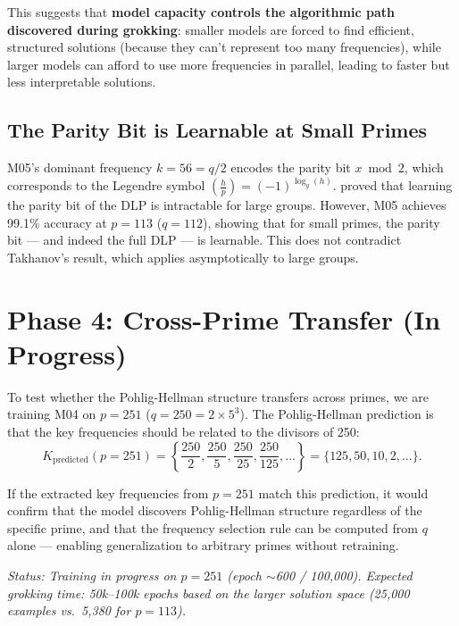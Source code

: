 \documentclass[11pt]{article}
\newcommand{\logg}{\log_g}
\begin{document}
This suggests that \textbf{model capacity controls the algorithmic path discovered during grokking}: smaller models are forced to find efficient, structured solutions (because they can't represent too many frequencies), while larger models can afford to use more frequencies in parallel, leading to faster but less interpretable solutions.

\subsection{The Parity Bit is Learnable at Small Primes}

M05's dominant frequency $k = 56 = q/2$ encodes the parity bit $x \bmod 2$, which corresponds to the Legendre symbol $\left(\frac{h}{p}\right) = (-1)^{\logg(h)}$. \citet{takhanov2024intractability} proved that learning the parity bit of the DLP is intractable for large groups. However, M05 achieves 99.1\% accuracy at $p = 113$ ($q = 112$), showing that for small primes, the parity bit --- and indeed the full DLP --- is learnable. This does not contradict Takhanov's result, which applies asymptotically to large groups.


\section{Phase 4: Cross-Prime Transfer (In Progress)}

To test whether the Pohlig-Hellman structure transfers across primes, we are training M04 on $p = 251$ ($q = 250 = 2 \times 5^3$). The Pohlig-Hellman prediction is that the key frequencies should be related to the divisors of 250:
\begin{equation}
    K_{\text{predicted}}(p = 251) = \left\{ \frac{250}{2}, \frac{250}{5}, \frac{250}{25}, \frac{250}{125}, \ldots \right\} = \{125, 50, 10, 2, \ldots\}.
\end{equation}

If the extracted key frequencies from $p = 251$ match this prediction, it would confirm that the model discovers Pohlig-Hellman structure regardless of the specific prime, and that the frequency selection rule can be computed from $q$ alone --- enabling generalization to arbitrary primes without retraining.

\textit{Status: Training in progress on $p = 251$ (epoch $\sim$600 / 100,000). Expected grokking time: 50k--100k epochs based on the larger solution space (25,000 examples vs.\ 5,380 for $p = 113$).}



\end{document}
